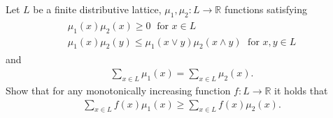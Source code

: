 \begin{problem}
  Let $L$ be a finite distributive lattice, $\mu_{1}, \mu_{2} : L \to \mathbb{R}$ functions satisfying
  \begin{align*}
    \begin{gathered}
      \mu_{1}(x) \mu_{2}(x) \geq 0 \; \text{ for } x \in L \\
      \mu_{1}(x) \mu_{2}(y) \leq \mu_{1}(x \vee y) \mu_{2}(x \wedge y) \; \text{ for } x,y \in L
    \end{gathered}
  \end{align*}
  and
  \begin{align*}
    \sum\limits_{x \in L} \mu_{1}(x) = \sum\limits_{x \in L} \mu_{2}(x).
  \end{align*}
  Show that for any monotonically increasing function $f : L \to \mathbb{R}$ it holds that
  \begin{align*}
    \sum_{x \in L} f(x) \mu_{1}(x) \geq \sum_{x \in L} f(x)  \mu_{2}(x).
  \end{align*}
\end{problem}
